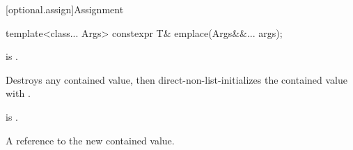 [optional.assign]{Assignment}

%
\begin{itemdecl}
template<class... Args>
  constexpr T& emplace(Args&&... args);
\end{itemdecl}

\begin{itemdescr}
\pnum
\mandates
{} is .

\pnum
\effects
Destroys any contained value, then direct-non-list-initializes the contained value with .

\pnum
\ensures
{} is .

\pnum
\returns
A reference to the new contained value.
\end{itemdescr}

